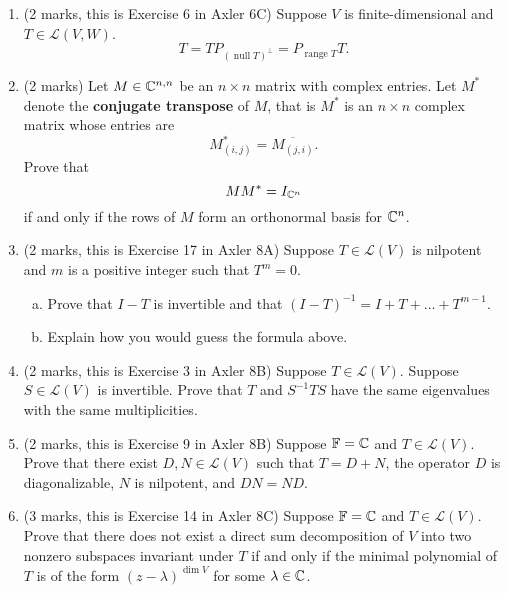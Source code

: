 \documentclass[12pt]{article}
\begin{document}
\begin{enumerate}
\item (2 marks, this is Exercise 6 in Axler 6C) Suppose $V$ is finite-dimensional and $T\in \mathcal{L}(V,W)$.
  \[
    T=TP_{(\operatorname{null}T)^\perp}=P_{\operatorname{range} T}T.
  \]
\item (2 marks) Let $M\in \mathbb{C}^{n,n}$ be an $n\times n$ matrix with complex entries. Let $M^*$ denote the \textbf{conjugate transpose} of $M$, that is $M^*$ is an $n\times n$ complex matrix whose entries are
  \[
    M^*_{(i,j)}=\overline{M_{(j,i)}}.
  \]
  Prove that
  \[
    MM^*=I_{\mathbb{C}^n}
  \]
  if and only if the rows of $M$ form an orthonormal basis for $\mathbb{C}^n$.
\item (2 marks, this is Exercise 17 in Axler 8A) Suppose $T\in \mathcal{L}(V)$ is nilpotent and $m$ is a positive integer such that $T^m=0$.
  \begin{enumerate}[(a)]
  \item Prove that $I-T$ is invertible and that $(I-T)^{-1}=I+T+\ldots +T^{m-1}$.
  \item Explain how you would guess the formula above.
  \end{enumerate}
\item (2 marks, this is Exercise 3 in Axler 8B) Suppose $T\in \mathcal{L}(V)$. Suppose $S\in \mathcal{L}(V)$ is invertible. Prove that $T$ and $S^{-1}TS$ have the same eigenvalues with the same multiplicities.
\item (2 marks, this is Exercise 9 in Axler 8B) Suppose $\mathbb{F}=\mathbb{C}$ and $T\in \mathcal{L}(V)$. Prove that there exist $D,N\in \mathcal{L}(V)$ such that $T=D+N$, the operator $D$ is diagonalizable, $N$ is nilpotent, and $DN=ND$.
\item (3 marks, this is Exercise 14 in Axler 8C) Suppose $\mathbb{F}=\mathbb{C}$ and $T\in \mathcal{L}(V)$. Prove that there does not exist a direct sum decomposition of $V$ into two nonzero subspaces invariant under $T$ if and only if the minimal polynomial of $T$ is of the form $(z-\lambda)^{\dim V}$ for some $\lambda\in \mathbb{C}$.
\end{enumerate}


{}

\end{document}
